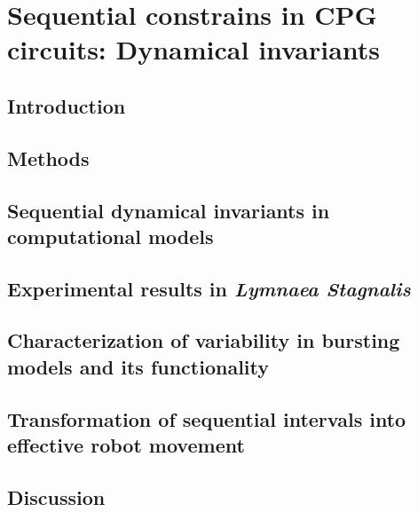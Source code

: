\chapter{Sequential constrains in CPG circuits: Dynamical invariants}
\label{c-invariants}
\section{Introduction}

\section{Methods}

\section{Sequential dynamical invariants in computational models}
\label{c-invariants-model}

\section{Experimental results in \textit{Lymnaea Stagnalis}}
\label{sec:experimental sussex}

\section{Characterization of variability in bursting models and its functionality}
\label{sec:model variability}

\section{Transformation of sequential intervals into effective robot movement}

\section{Discussion}
